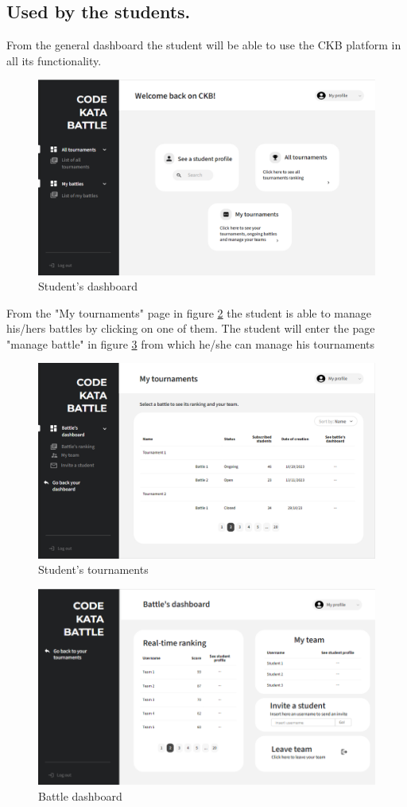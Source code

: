\subsection*{Used by the students.}
From the general dashboard the student will be able to use the CKB platform in all its functionality. 
\begin{figure}[h]
    \centering
    \includegraphics[width=\textwidth]{images/mockups/students/Sdashboard.png}
    \caption{Student's dashboard}
    \label{fig:Sdash}
\end{figure}

From the "My tournaments" page in figure \ref{fig:SmyT} the student is able to manage his/hers battles by clicking on one of them. The student will enter the page "manage battle" in figure \ref{fig:battleDash} from which he/she can manage his tournaments
\begin{figure}[h]
    \centering
    \includegraphics[width=\textwidth]{images/mockups/students/MyTournaments.png}
    \caption{Student's tournaments}
    \label{fig:SmyT}
\end{figure}

\begin{figure}[h]
    \centering
    \includegraphics[width=\textwidth]{images/mockups/students/BattleDashboard.png}
    \caption{Battle dashboard}
    \label{fig:battleDash}
\end{figure}


